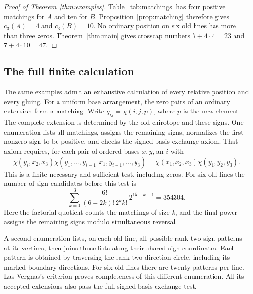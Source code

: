 \documentclass[11pt]{article}
\theoremstyle{definition}\newtheorem{definition}[theorem]{Definition}
\begin{document}
\begin{proof}[Proof of Theorem~\ref{thm:examples}]
Table~\ref{tab:matchings} has four positive matchings for $A$ and
ten for $B$. Proposition~\ref{prop:matching} therefore gives
$c_3(A)=4$ and $c_3(B)=10$. No ordinary position on six old lines
has more than three zeros. Theorem~\ref{thm:main} gives crosscap
numbers $7+4\cdot4=23$ and $7+4\cdot10=47$.
\end{proof}

\subsection*{The full finite calculation}
The same examples admit an exhaustive calculation of every relative
position and every gluing. For a uniform base arrangement, the zero
pairs of an ordinary extension form a matching. Write
$q_{ij}=\chi(i,j,p)$, where $p$ is the new element. The complete
extension is determined by the old chirotope and these signs.
One enumeration lists all matchings, assigns the remaining signs,
normalizes the first nonzero sign to be positive, and checks the
signed basis-exchange axiom. That axiom requires, for each pair of
ordered bases $x,y$, an $i$ with
\[
 \chi(y_i,x_2,x_3)
 \chi(y_1,\ldots,y_{i-1},x_1,y_{i+1},\ldots,y_3)
 =\chi(x_1,x_2,x_3)\chi(y_1,y_2,y_3).
\]
This is a finite necessary and sufficient test, including zeros.
For six old lines the number of sign candidates before this test is
\[
 \sum_{k=0}^{3}
 \frac{6!}{(6-2k)!\,2^k k!}\,2^{15-k-1}=354304.
\]
Here the factorial quotient counts the matchings of size $k$, and
the final power assigns the remaining signs modulo simultaneous reversal.

A second enumeration lists, on each old line, all possible rank-two
sign patterns at its vertices, then joins those lists along their
shared sign coordinates. Each pattern is obtained by traversing the
rank-two direction circle, including its marked boundary directions.
For six old lines there are twenty patterns per line. Las Vergnas's
criterion proves completeness of this different enumeration. All its
accepted extensions also pass the full signed basis-exchange test.
\end{document}
